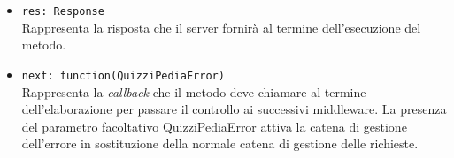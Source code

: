 \begin{itemize}
\begin{itemize}
\begin{itemize}
			\item \texttt{res: Response}\\
			Rappresenta la risposta che il server fornirà al termine dell'esecuzione del metodo.
			\item \texttt{next: function(QuizziPediaError)}\\
			Rappresenta la \textit{callback} che il metodo deve chiamare al termine dell’elaborazione per passare il controllo ai successivi middleware. La presenza del parametro facoltativo QuizziPediaError attiva la catena di gestione dell’errore in sostituzione della normale catena di gestione delle richieste.
		\end{itemize}
	\end{itemize}
\end{itemize}
